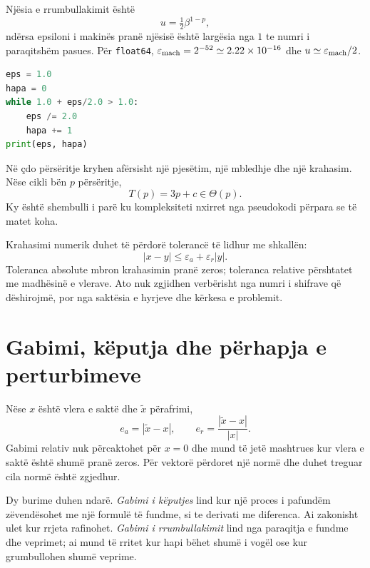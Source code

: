 \documentclass[11pt,oneside,openany]{book}
\begin{document}
Njësia e rrumbullakimit është
\begin{equation}
 u=\tfrac12\beta^{1-p},
\end{equation}
ndërsa epsiloni i makinës pranë njësisë është largësia nga $1$ te numri i
paraqitshëm pasues. Për \texttt{float64},
$\varepsilon_{\rm mach}=2^{-52}\simeq2.22\times10^{-16}$ dhe
$u\simeq\varepsilon_{\rm mach}/2$.

\begin{lstlisting}[language=Python,caption={Matja e epsilonit të makinës.}]
eps = 1.0
hapa = 0
while 1.0 + eps/2.0 > 1.0:
    eps /= 2.0
    hapa += 1
print(eps, hapa)
\end{lstlisting}

Në çdo përsëritje kryhen afërsisht një pjesëtim, një mbledhje dhe një
krahasim. Nëse cikli bën $p$ përsëritje,
\begin{equation}
 T(p)=3p+c\in\Theta(p).
\end{equation}
Ky është shembulli i parë ku kompleksiteti nxirret nga pseudokodi përpara se
të matet koha.

Krahasimi numerik duhet të përdorë tolerancë të lidhur me shkallën:
\begin{equation}
 |x-y|\leq\varepsilon_a+\varepsilon_r|y|.
\end{equation}
Toleranca absolute mbron krahasimin pranë zeros; toleranca relative përshtatet
me madhësinë e vlerave. Ato nuk zgjidhen verbërisht nga numri i shifrave që
dëshirojmë, por nga saktësia e hyrjeve dhe kërkesa e problemit.

\section{Gabimi, këputja dhe përhapja e perturbimeve}
Nëse $x$ është vlera e saktë dhe $\widetilde x$ përafrimi,
\begin{equation}
 e_a=|\widetilde x-x|,
 \qquad
 e_r=\frac{|\widetilde x-x|}{|x|}.
\end{equation}
Gabimi relativ nuk përcaktohet për $x=0$ dhe mund të jetë mashtrues kur
vlera e saktë është shumë pranë zeros. Për vektorë përdoret një normë dhe
duhet treguar cila normë është zgjedhur.

Dy burime duhen ndarë. \emph{Gabimi i këputjes} lind kur një proces i pafundëm
zëvendësohet me një formulë të fundme, si te derivati me diferenca. Ai
zakonisht ulet kur rrjeta rafinohet. \emph{Gabimi i rrumbullakimit} lind nga
paraqitja e fundme dhe veprimet; ai mund të rritet kur hapi bëhet shumë i
vogël ose kur grumbullohen shumë veprime.
\end{document}
